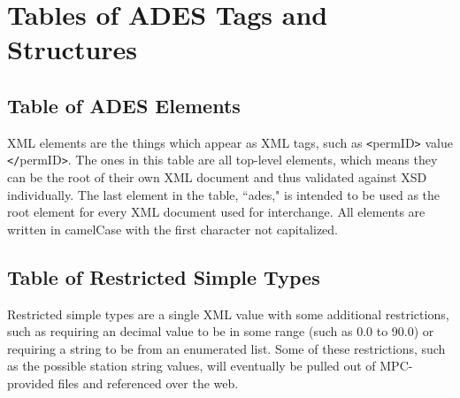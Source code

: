 \documentclass[12pt]{article}
\begin{document}
\newpage{}

\appendix{}

\section{Tables of ADES Tags and Structures}


\subsection{Table of ADES Elements}
XML elements are the things which appear as XML tags, such as \verb|<|permID\verb|>| value \verb|</|permID\verb|>|.  The ones in this table are all top-level elements, which means they can be the root of their own XML document and thus validated against XSD individually.   The last element in the table, ``ades," is intended to be used as the root element for every XML document used for interchange.  All elements are written in camelCase with the first character not capitalized.


\subsection{Table of Restricted Simple Types}
Restricted simple types are a single XML value with some additional restrictions, such as requiring an decimal value to be in some range (such as 0.0 to 90.0) or requiring a string to be from an enumerated list.   Some of these restrictions, such as the possible station string values, will eventually be pulled out of MPC-provided files and referenced over the web.



   
\end{document}
